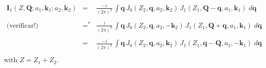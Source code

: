 \begin{eqnarray} \label{Q-I1-Ja}
\bm{I}_{1}(Z,\bm{Q}; a_{1},\bm{k}_{1}; a_{2},\bm{k}_{2} ) &=&\frac{-
i }{(2 \pi)^{3}}\,\int \bm{q} \, J_{0}(Z_{2}, \bm{q},
a_{2},\bm{k}_{2}) \,
J_{1}(Z_{1}, \bm{Q}- \bm{q}, a_{1}, \bm{k}_{1} ) \; d \bm{q}
\nonumber \\ \\
\label{Q-I1-Jb} \mbox{(verificar!)} &=^{*}&  \frac{i }{(2
\pi)^{3}}\,\int \bm{q} \, J_{0}(Z_{2}, \bm{q}, a_{2}, - \bm{k}_{2}) \,
J_{1}(Z_{1}, \bm{Q} + \bm{q}, a_{1}, \bm{k}_{1} ) \; d \bm{q}
\nonumber \\  \\  \label{Q-I1-Jc} &=&\frac{- i }{(2 \pi)^{3}}\,\int
\bm{q} \, J_{0}(Z_{2}, \bm{q}, a_{2},\bm{k}_{2}) \, J_{1}(Z_{1},
\bm{q}- \bm{Q}, a_{1}, - \bm{k}_{1} ) \;
d \bm{q}    \nonumber \\
\end{eqnarray}
with $Z = Z_{1} + Z_{2}$.

